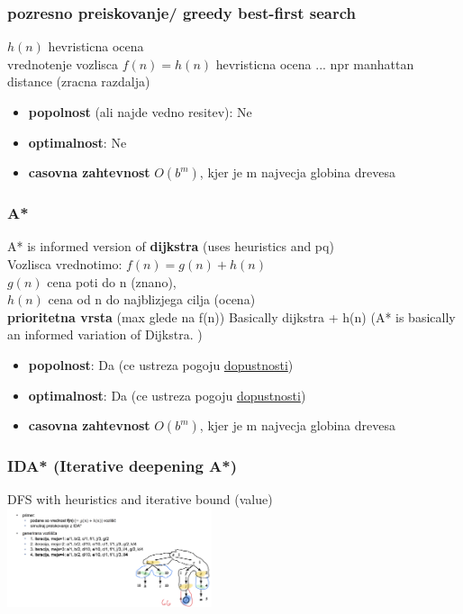 \subsubsection{pozresno preiskovanje/ greedy best-first search}
$h(n)$ hevristicna ocena\\
vrednotenje vozlisca $f(n)=h(n)$
hevristicna ocena ... npr manhattan distance (zracna razdalja)

\begin{itemize}[noitemsep,topsep=0pt,leftmargin=*]
    \item \textbf{popolnost} (ali najde vedno resitev): Ne
    \item \textbf{optimalnost}: Ne
    \item \textbf{casovna zahtevnost} $O(b^m)$, kjer je m najvecja globina drevesa
\end{itemize}

\subsubsection{A*}
A* is informed version of \textbf{dijkstra} (uses heuristics and pq)\\
Vozlisca vrednotimo: $f(n)=g(n)+h(n)$\\ 
$g(n)$ cena poti do n (znano),\\ 
$h(n)$ cena od n do najblizjega cilja (ocena)\\
\textbf{prioritetna vrsta} (max glede na f(n))
Basically dijkstra + h(n) (A* is basically an informed variation of Dijkstra.
)
\begin{itemize}[noitemsep,topsep=0pt,leftmargin=*]
    \item \textbf{popolnost}: Da (ce ustreza pogoju \underline{dopustnosti})
    \item \textbf{optimalnost}: Da (ce ustreza pogoju \underline{dopustnosti}) 
    \item \textbf{casovna zahtevnost} $O(b^m)$, kjer je m najvecja globina drevesa
\end{itemize}


\subsubsection{IDA* (Iterative deepening A*)}
DFS with heuristics and iterative bound (value)\\

\includegraphics[width=6cm]{./images/ida*.png}

